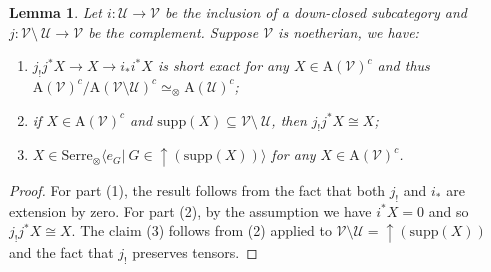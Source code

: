 \documentclass[11pt,a4paper]{amsart}
\numberwithin{equation}{section} \theoremstyle{plain}
\newtheorem{lem}{Lemma}[section]
\begin{document}
\begin{lem}\label{lem4.12} Let $i:\mathcal{U}\rightarrow \mathcal{V}$ be the inclusion of a down-closed subcategory  and $j:\mathcal{V}\setminus~\mathcal{U}\rightarrow \mathcal{V}$ be the complement. Suppose $\mathcal{V}$ is noetherian, we have:
\begin{enumerate}
\item $j_{!}j^{*}X\rightarrow X\rightarrow i_{*}i^{*}X$ is short exact for any $X\in \mathrm{A}(\mathcal{V})^{c}$ and thus $\mathrm{A}(\mathcal{V})^{c}/\mathrm{A}(\mathcal{V}\setminus \mathcal{U})^{c}\simeq_{\otimes} \mathrm{A}(\mathcal{U})^{c} $;

\item if $X\in \mathrm{A}(\mathcal{V})^{c}$ and $ \mathrm{supp}(X)\subseteq \mathcal{V}\setminus~\mathcal{U}$, then $j_{!}j^{*}X\cong X$;

\item $X\in \mathrm{Serre}_{\otimes}\langle e_{G}|~G\in \uparrow(\mathrm{supp}(X))\rangle$ for any $X\in \mathrm{A}(\mathcal{V})^{c}$.

\end{enumerate}
\end{lem}
\begin{proof}For part (1), the result follows from the fact that both $j_{!}$ and $i_{*}$ are extension by zero.
For part (2), by the assumption we have $i^{*}X=0$ and so $j_{!}j^{*}X\cong X$. The claim (3) follows from (2) applied to $\mathcal{V}\setminus \mathcal{U}= \uparrow(\mathrm{supp}(X))$ and the fact that $j_{!}$ preserves tensors.
\end{proof}
\end{document}
